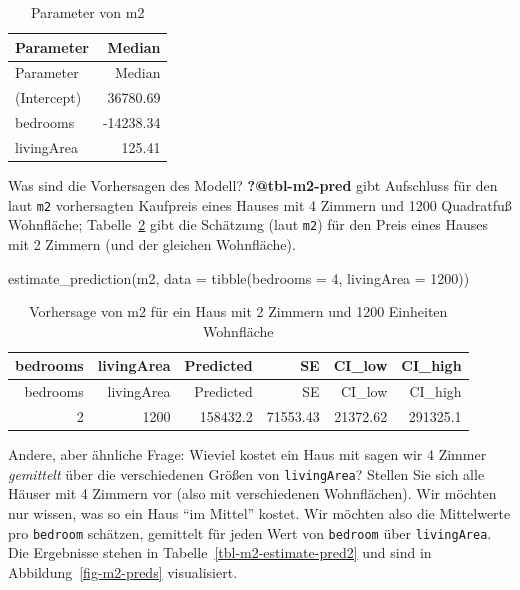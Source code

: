 \documentclass[
  a4paper,
  DIV=11]{scrreprt}
\newenvironment{Shaded}{\begin{snugshade}}{\end{snugshade}}
\newcommand{\AttributeTok}[1]{\textcolor[rgb]{0.40,0.45,0.13}{#1}}
\newcommand{\DecValTok}[1]{\textcolor[rgb]{0.68,0.00,0.00}{#1}}
\newcommand{\FunctionTok}[1]{\textcolor[rgb]{0.28,0.35,0.67}{#1}}
\newcommand{\NormalTok}[1]{\textcolor[rgb]{0.00,0.23,0.31}{#1}}
\theoremstyle{definition}
\theoremstyle{remark}
\begin{document}
\hypertarget{tbl-m2}{}
\begin{longtable}[]{@{}lr@{}}
\caption{\label{tbl-m2}Parameter von m2}\tabularnewline
\toprule()
Parameter & Median \\
\midrule()
\endfirsthead
\toprule()
Parameter & Median \\
\midrule()
\endhead
(Intercept) & 36780.69 \\
bedrooms & -14238.34 \\
livingArea & 125.41 \\
\bottomrule()
\end{longtable}

Was sind die Vorhersagen des Modell? \textbf{?@tbl-m2-pred} gibt
Aufschluss für den laut \texttt{m2} vorhersagten Kaufpreis eines Hauses
mit 4 Zimmern und 1200 Quadratfuß Wohnfläche; Tabelle~\ref{tbl-m2-pred2}
gibt die Schätzung (laut \texttt{m2}) für den Preis eines Hauses mit 2
Zimmern (und der gleichen Wohnfläche).

\begin{Shaded}
\begin{Highlighting}[]
\FunctionTok{estimate\_prediction}\NormalTok{(m2, }\AttributeTok{data =} \FunctionTok{tibble}\NormalTok{(}\AttributeTok{bedrooms =} \DecValTok{4}\NormalTok{, }\AttributeTok{livingArea =} \DecValTok{1200}\NormalTok{))}
\end{Highlighting}
\end{Shaded}

\hypertarget{tbl-m2-pred2}{}
\begin{longtable}[]{@{}rrrrrr@{}}
\caption{\label{tbl-m2-pred2}Vorhersage von m2 für ein Haus mit 2
Zimmern und 1200 Einheiten Wohnfläche}\tabularnewline
\toprule()
bedrooms & livingArea & Predicted & SE & CI\_low & CI\_high \\
\midrule()
\endfirsthead
\toprule()
bedrooms & livingArea & Predicted & SE & CI\_low & CI\_high \\
\midrule()
\endhead
2 & 1200 & 158432.2 & 71553.43 & 21372.62 & 291325.1 \\
\bottomrule()
\end{longtable}

Andere, aber ähnliche Frage: Wieviel kostet ein Haus mit sagen wir 4
Zimmer \emph{gemittelt} über die verschiedenen Größen von
\texttt{livingArea}? Stellen Sie sich alle Häuser mit 4 Zimmern vor
(also mit verschiedenen Wohnflächen). Wir möchten nur wissen, was so ein
Haus ``im Mittel'' kostet. Wir möchten also die Mittelwerte pro
\texttt{bedroom} schätzen, gemittelt für jeden Wert von \texttt{bedroom}
über \texttt{livingArea}. Die Ergebnisse stehen in
Tabelle~\ref{tbl-m2-estimate-pred2} und sind in
Abbildung~\ref{fig-m2-preds} visualisiert.
\end{document}
